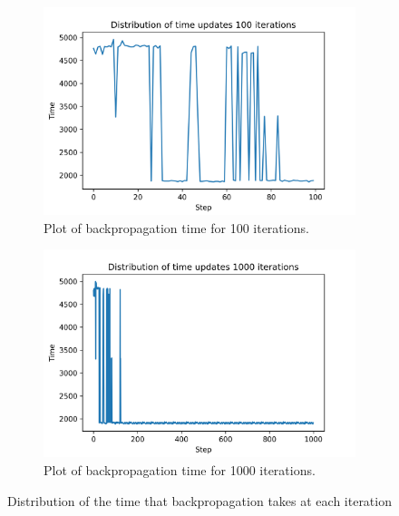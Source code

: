 \begin{figure}[!ht]
\centering
     \begin{subfigure}[b]{0.4\textwidth}
         \centering
         \includegraphics[width=\textwidth]{Images/plot_distribution_time_update_100.png}
         \caption{Plot of backpropagation time for 100 iterations.}
         \label{fig:time_100_iterations}
     \end{subfigure}
     \hfill
     \begin{subfigure}[b]{0.4\textwidth}
         \centering
         \includegraphics[width=\textwidth]{Images/plot_distribution_time_update_1000.png}
         \caption{Plot of backpropagation time for 1000 iterations.}
         \label{fig:time_1000_iterations}
     \end{subfigure}
     \hfill
        \caption{Distribution of the time that backpropagation takes at each iteration}
        \label{time_backpropagations_iterations}
\end{figure}

